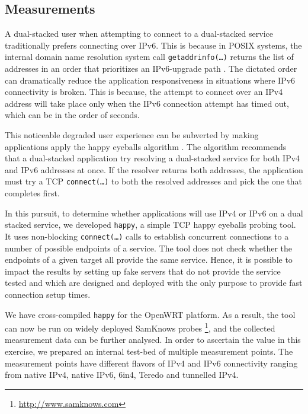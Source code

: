 \subsection{Measurements}

A dual-stacked user when attempting to connect to a dual-stacked service
traditionally prefers connecting over IPv6. This is because in POSIX systems,
the internal domain name resolution system call \texttt{getaddrinfo(\ldots)}
\cite{rfc3493} returns the list of addresses in an order that prioritizes an
IPv6-upgrade path \cite{rfc3484}. The dictated order can dramatically reduce
the application responsiveness in situations where IPv6 connectivity is
broken. This is because, the attempt to connect over an IPv4 address will take
place only when the IPv6 connection attempt has timed out, which can be in the
order of seconds.

This noticeable degraded user experience can be subverted by making
applications apply the happy eyeballs algorithm \cite{rfc6555}. The algorithm
recommends that a dual-stacked application try resolving a dual-stacked
service for both IPv4 and IPv6 addresses at once. If the resolver returns both
addresses, the application must try a TCP \texttt{connect(\ldots)} to both the
resolved addresses and pick the one that completes first.

In this pursuit, to determine whether applications will use IPv4 or IPv6 on a
dual stacked service, we developed \texttt{happy}, a simple TCP happy eyeballs
probing tool. It uses non-blocking \texttt{connect(\ldots)} calls to establish
concurrent connections to a number of possible endpoints of a service. The
tool does not check whether the endpoints of a given target all provide the
same service. Hence, it is possible to impact the results by setting up fake
servers that do not provide the service tested and which are designed and
deployed with the only purpose to provide fast connection setup times.

We have cross-compiled \texttt{happy} for the OpenWRT \cite{fainelli:2008}
platform. As a result, the tool can now be run on widely deployed SamKnows
probes \footnote{\url{http://www.samknows.com}}, and the collected measurement
data can be further analysed. In order to ascertain the value in this
exercise, we prepared an internal test-bed of multiple measurement points. The
measurement points have different flavors of IPv4 and IPv6 connectivity
ranging from native IPv4, native IPv6, 6in4, Teredo \cite{rfc4380} and
tunnelled IPv4.

